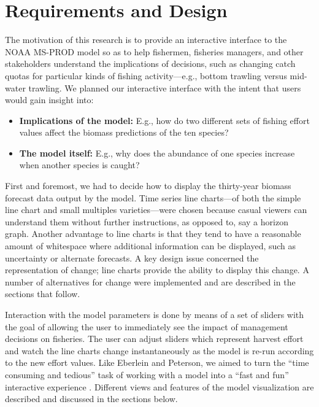 \chapter{Requirements and Design}


The motivation of this research is to provide an interactive interface to the NOAA MS-PROD model so as to help fishermen, fisheries managers, and other stakeholders understand the implications of decisions, such as changing catch quotas for particular kinds of fishing activity---e.g., bottom trawling versus mid-water trawling.  We planned our interactive interface with the intent that users would gain insight into:

\begin{itemize}
	\item \textbf{Implications of the model:}  E.g., how do two different sets of fishing effort values affect the biomass predictions of the ten species?
	\item \textbf{The model itself:}  E.g., why does the abundance of one species increase when another species is caught? 
\end{itemize} 

First and foremost, we had to decide how to display the thirty-year biomass forecast data output by the model.  Time series line charts---of both the simple line chart and small multiples varieties---were chosen because casual viewers can understand them without further instructions, as opposed to, say a horizon graph.  Another advantage to line charts is that they tend to have a reasonable amount of whitespace where additional information can be displayed, such as uncertainty or alternate forecasts. A key design issue concerned the representation of change; line charts provide the ability to display this change.  A number of alternatives for change were implemented and are described in the sections that follow.

Interaction with the model parameters is done by means of a set of sliders with the goal of allowing the user to immediately see the impact of management decisions on fisheries.  The user can adjust sliders which represent harvest effort and watch the line charts change instantaneously as the model is re-run according to the new effort values.  Like Eberlein and Peterson, we aimed to turn the ``time consuming and tedious'' task of working with a model into a ``fast and fun'' interactive experience \cite{eberlein1992}.  Different views and features of the model visualization are described and discussed in the sections below.  

